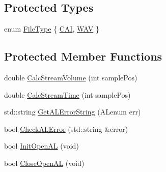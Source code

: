 \subsection*{Protected Types}
\begin{DoxyCompactItemize}
\item 
enum \hyperlink{classmts_open_a_l_play_a69403fe8d56192bf43c92ead689f4cf7}{File\-Type} \{ \hyperlink{classmts_open_a_l_play_a69403fe8d56192bf43c92ead689f4cf7ac4f39c368f78ea94196d522d5663b604}{C\-A\-I}, 
\hyperlink{classmts_open_a_l_play_a69403fe8d56192bf43c92ead689f4cf7a0836988f58bd92f7644e30453bf421b2}{W\-A\-V}
 \}
\end{DoxyCompactItemize}
\subsection*{Protected Member Functions}
\begin{DoxyCompactItemize}
\item 
double \hyperlink{classmts_open_a_l_play_a0ac6b3948a7f3a9a0c78682ee95e0d85}{Calc\-Stream\-Volume} (int sample\-Pos)
\item 
double \hyperlink{classmts_open_a_l_play_ac2616803fafe20bdc10dee85ba97433f}{Calc\-Stream\-Time} (int sample\-Pos)
\item 
std\-::string \hyperlink{classmts_open_a_l_play_a7851ce30c950784a75b9f2979ca90bb9}{Get\-A\-L\-Error\-String} (A\-Lenum err)
\item 
bool \hyperlink{classmts_open_a_l_play_a5e8c6b07650e9137232255dec6d443a6}{Check\-A\-L\-Error} (std\-::string \&error)
\item 
bool \hyperlink{classmts_open_a_l_play_a21f76e5a63a314439324f5456b93eb87}{Init\-Open\-A\-L} (void)
\item 
bool \hyperlink{classmts_open_a_l_play_ad75e7330a2213fa6d7491701d47bc157}{Close\-Open\-A\-L} (void)
\end{DoxyCompactItemize}
